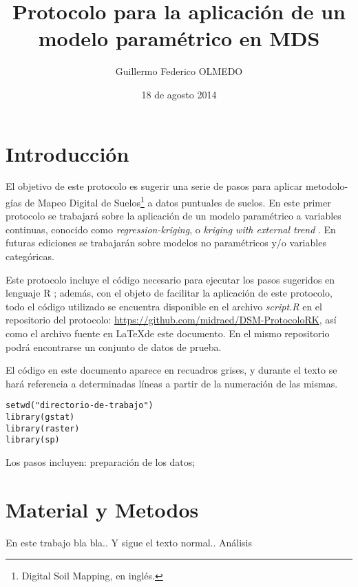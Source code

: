 \documentclass[10pt,a4paper]{article}
\date{18 de agosto 2014}
\title{Protocolo para la aplicación de un modelo paramétrico en MDS}
\author{Guillermo Federico OLMEDO}
\begin{document}
\maketitle
\section{Introducción}
El objetivo de este protocolo es sugerir una serie de pasos para aplicar metodolo- gías de Mapeo Digital de Suelos\footnote{Digital Soil Mapping, en inglés.} a datos puntuales de suelos. En este primer protocolo se trabajará sobre la aplicación de un modelo paramétrico a variables continuas, conocido como \textit{regression-kriging}, o \textit{kriging with external trend} \citep{hengl_practical_2009}. En futuras ediciones se trabajarán sobre modelos no paramétricos y/o variables categóricas. 

Este protocolo incluye el código necesario para ejecutar los pasos sugeridos en lenguaje R \citep{R}; además, con el objeto de facilitar la aplicación de este protocolo, todo el código utilizado se encuentra disponible en el archivo \textit{script.R} en el repositorio del protocolo: 
\url{https://github.com/midraed/DSM-ProtocoloRK}, así como el archivo fuente en \LaTeX\space de este documento. En el mismo repositorio podrá encontrarse un conjunto de datos de prueba.

El código en este documento aparece en recuadros grises, y durante el texto se hará referencia a determinadas líneas a partir de la numeración de las mismas.
\begin{lstlisting}
setwd("directorio-de-trabajo")
library(gstat)
library(raster)
library(sp)
\end{lstlisting}
Los pasos incluyen: preparación de los datos; 
\section{Material y Metodos}
En este trabajo bla bla.. \citep*{graziotin_web-based_2013}
Y sigue el texto normal..\citep*{webster_geostatistics_2007} Análisis
\end{document}
